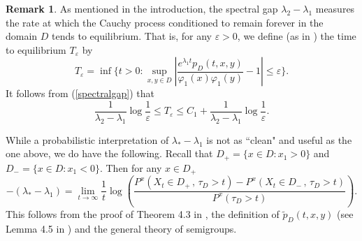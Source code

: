 \documentclass[11pt,leqno]{article}
\theoremstyle{definition}
\newtheorem{rem}{Remark}[section]
\newcommand{\eps}{\varepsilon}
\numberwithin{equation}{section}
\begin{document}
\begin{rem}
As mentioned in the introduction, the spectral gap $\lambda_2-\lambda_1$ measures the
rate at which the  Cauchy process conditioned to remain forever in the domain $D$ tends
to equilibrium.  That is, for any $\varepsilon>0$, we define (as in \cite{SaCo}) the time to
equilibrium $T_{\varepsilon}$ by 
\begin{equation}
T_{\varepsilon}=\inf\{t>0: \sup_{x,y \in D} \left|\frac{e^{\lambda_1 t}p_D(t,x,y)}{ \varphi_1(x)
\varphi_1(y)} - 1
 \right| \leq \varepsilon\}.
\end{equation}
It follows from (\ref{spectralgap}) that 
$$
\frac{1}{\lambda_2-\lambda_1}\log{\frac{1}{\varepsilon}}\leq T_{\eps}
\leq
C_1+\frac{1}{\lambda_2-\lambda_1}\log{\frac{1}{\varepsilon}}.
$$

While a probabilistic interpretation of $\lambda_*-\lambda_1$ is not as ``clean" and useful
as the one above, we do have the following.  Recall that $D_+ = \{x \in D: x_1 > 0\}$ and
$D_- =
\{x
\in D: x_1 < 0\}$.  
Then for any $x \in D_+$
\begin{equation}
-(\lambda_*-\lambda_1)=\lim_{t\to\infty}{\frac{1}{t}}
\log\left(\frac{P^{x}(X_t \in D_+ \, , \, \tau_D > t) -
P^{x}(X_t
\in D_-
\, ,
\,
\tau_D
  > t) }{P^{x}(\tau_D > t)}\right). 
\end{equation}
This follows from the proof of Theorem 4.3 in \cite{BK}, the definition
of $\tilde{p}_D(t,x,y)$ (see Lemma 4.5 in \cite{BK}) and the general
theory of semigroups.

 
\end{rem} 
\end{document}
